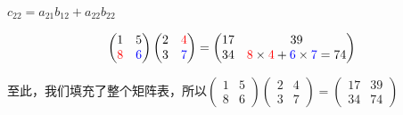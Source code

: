 $c_{22}=a_{21}b_{12}+a_{22}b_{22}$

$$\begin{pmatrix}  
	1 & 5 \\  
	\textcolor{red}{8} & \textcolor{blue}{6}  
  \end{pmatrix} \begin{pmatrix}  
	{2} & \textcolor{red}{4} \\  
	{3} & \textcolor{blue}{7}  
  \end{pmatrix}=\begin{pmatrix}  
	17 & 39 \\  
	34 & \textcolor{red}{8}\times \textcolor{red}{4}+\textcolor{blue}{6}\times \textcolor{blue}{7}=74
\end{pmatrix} $$

至此，我们填充了整个矩阵表，所以$\begin{pmatrix}  
	1 & 5 \\  
	8 & 6  
  \end{pmatrix} \begin{pmatrix}  
	2 & 4 \\  
	3 & 7  
  \end{pmatrix}=\begin{pmatrix}  
	17 & 39 \\  
	34 & 74  
  \end{pmatrix} $

